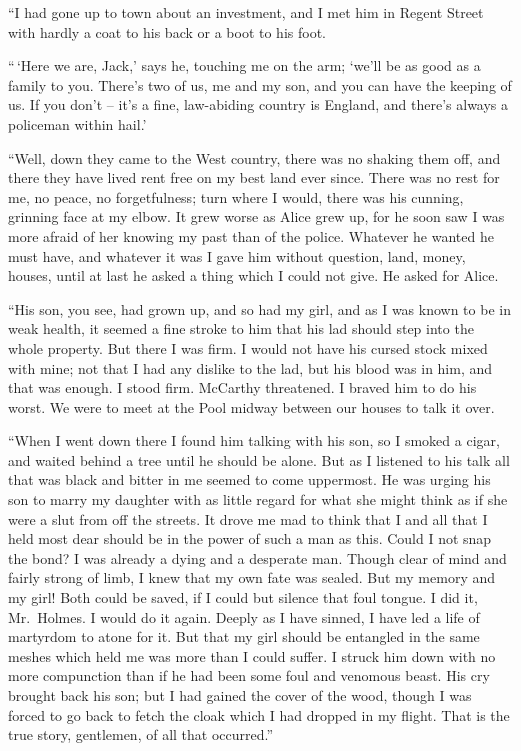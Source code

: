 “I had gone up to town about an investment, and I met
him in Regent Street with hardly a coat to his back or a boot
to his foot.

“\,‘Here we are, Jack,’ says he, touching me on the arm;
‘we’ll be as good as a family to you. There’s two of us, me
and my son, and you can have the keeping of us. If you
don’t -- it’s a fine, law-abiding country is England, and there’s
always a policeman within hail.’

“Well, down they came to the West country, there was no
shaking them off, and there they have lived rent free on my
best land ever since. There was no rest for me, no peace, no
forgetfulness; turn where I would, there was his cunning,
grinning face at my elbow. It grew worse as Alice grew up,
for he soon saw I was more afraid of her knowing my past
than of the police. Whatever he wanted he must have, and
whatever it was I gave him without question, land, money,
houses, until at last he asked a thing which I could not give.
He asked for Alice.

“His son, you see, had grown up, and so had my girl, and
as I was known to be in weak health, it seemed a fine stroke
to him that his lad should step into the whole property. But
there I was firm. I would not have his cursed stock mixed
with mine; not that I had any dislike to the lad, but his blood
was in him, and that was enough. I stood firm. McCarthy
threatened. I braved him to do his worst. We were to meet
at the Pool midway between our houses to talk it over.

“When I went down there I found him talking with his
son, so I smoked a cigar, and waited behind a tree until he
should be alone. But as I listened to his talk all that was
black and bitter in me seemed to come uppermost. He was
urging his son to marry my daughter with as little regard for
what she might think as if she were a slut from off the streets.
It drove me mad to think that I and all that I held most dear
should be in the power of such a man as this. Could I not
snap the bond? I was already a dying and a desperate man.
Though clear of mind and fairly strong of limb, I knew that
my own fate was sealed. But my memory and my girl!
Both could be saved, if I could but silence that foul tongue.
I did it, Mr.~Holmes. I would do it again. Deeply as I have
sinned, I have led a life of martyrdom to atone for it. But
that my girl should be entangled in the same meshes which
held me was more than I could suffer. I struck him down
with no more compunction than if he had been some foul and
venomous beast. His cry brought back his son; but I had
gained the cover of the wood, though I was forced to go back
to fetch the cloak which I had dropped in my flight. That is
the true story, gentlemen, of all that occurred.”

